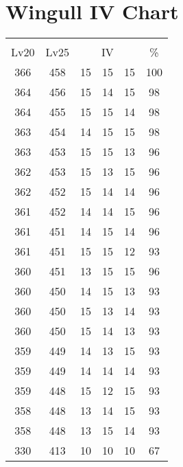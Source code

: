 \documentclass{article}%
\begin{document}
%
\normalsize%
\section{Wingull IV Chart}%
\label{sec:Wingull IV Chart}%
\renewcommand{\arraystretch}{1.5}%
\begin{tabular}{|c|c|c|c|c|c|}%
\hline%
\multicolumn{6}{|c|}{\textcolor{white}{ 
\linebreak{Wingull}
}%
\cellcolor{black}}\\%
\multicolumn{1}{|c}{Lv20}&\multicolumn{1}{c|}{Lv25}&\multicolumn{3}{c|}{IV}&\multicolumn{1}{|c|}{\%}\\%
\hline%
\rowcolor{color100}%
366&458&15&15&15&100\\%
\hline%
\rowcolor{color98}%
364&456&15&14&15&98\\%
\hline%
\rowcolor{color98}%
364&455&15&15&14&98\\%
\hline%
\rowcolor{color98}%
363&454&14&15&15&98\\%
\hline%
\rowcolor{color96}%
363&453&15&15&13&96\\%
\hline%
\rowcolor{color96}%
362&453&15&13&15&96\\%
\hline%
\rowcolor{color96}%
362&452&15&14&14&96\\%
\hline%
\rowcolor{color96}%
361&452&14&14&15&96\\%
\hline%
\rowcolor{color96}%
361&451&14&15&14&96\\%
\hline%
\rowcolor{color93}%
361&451&15&15&12&93\\%
\hline%
\rowcolor{color96}%
360&451&13&15&15&96\\%
\hline%
\rowcolor{color93}%
360&450&14&15&13&93\\%
\hline%
\rowcolor{color93}%
360&450&15&13&14&93\\%
\hline%
\rowcolor{color93}%
360&450&15&14&13&93\\%
\hline%
\rowcolor{color93}%
359&449&14&13&15&93\\%
\hline%
\rowcolor{color93}%
359&449&14&14&14&93\\%
\hline%
\rowcolor{color93}%
359&448&15&12&15&93\\%
\hline%
\rowcolor{color93}%
358&448&13&14&15&93\\%
\hline%
\rowcolor{color93}%
358&448&13&15&14&93\\%
\hline%
\rowcolor{color91}%
330&413&10&10&10&67\\%
\end{tabular}

%
\end{document}
